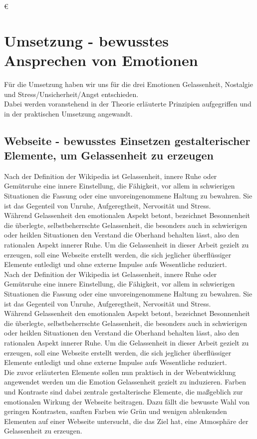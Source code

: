 €\documentclass[./dokumentation.tex]{subfiles}
\begin{document}
\chapter{Umsetzung - bewusstes Ansprechen von Emotionen}
Für die Umsetzung haben wir uns für die drei Emotionen Gelassenheit, Nostalgie und Stress/Unsicherheit/Angst entschieden.\\ 
Dabei werden voranstehend in der Theorie erläuterte Prinzipien aufgegriffen und in der praktischen Umsetzung angewandt.

\section{Webseite - bewusstes Einsetzen gestalterischer Elemente, um Gelassenheit zu erzeugen}
Nach der Definition der Wikipedia ist Gelassenheit, innere Ruhe oder Gemütsruhe eine innere Einstellung, die Fähigkeit, vor allem in schwierigen Situationen die Fassung oder eine unvoreingenommene Haltung zu bewahren. Sie ist das Gegenteil von Unruhe, Aufgeregtheit, Nervosität und Stress.\\
Während Gelassenheit den emotionalen Aspekt betont, bezeichnet Besonnenheit die überlegte, selbstbeherrschte Gelassenheit, die besonders auch in schwierigen oder heiklen Situationen den Verstand die Oberhand behalten lässt, also den rationalen Aspekt innerer Ruhe.
Um die Gelassenheit in dieser Arbeit gezielt zu erzeugen, soll eine Webseite erstellt werden, die sich jeglicher überflüssiger Elemente entledigt und ohne externe Impulse aufs Wesentliche reduziert.\\
Nach der Definition der Wikipedia ist Gelassenheit, innere Ruhe oder Gemütsruhe eine innere Einstellung, die Fähigkeit, vor allem in schwierigen Situationen die Fassung oder eine unvoreingenommene Haltung zu bewahren. Sie ist das Gegenteil von Unruhe, Aufgeregtheit, Nervosität und Stress. \\
Während Gelassenheit den emotionalen Aspekt betont, bezeichnet Besonnenheit die überlegte, selbstbeherrschte Gelassenheit, die besonders auch in schwierigen oder heiklen Situationen den Verstand die Oberhand behalten lässt, also den rationalen Aspekt innerer Ruhe.
Um die Gelassenheit in dieser Arbeit gezielt zu erzeugen, soll eine Webseite erstellt werden, die sich jeglicher überflüssiger Elemente entledigt und ohne externe Impulse aufs Wesentliche reduziert.\\
Die zuvor erläuterten Elemente sollen nun praktisch in der Webentwicklung angewendet werden um die Emotion Gelassenheit gezielt zu induzieren. Farben und Kontraste sind dabei zentrale gestalterische Elemente, die maßgeblich zur emotionalen Wirkung der Webseite beitragen. Dazu fällt die bewusste Wahl von geringen Kontrasten, sanften Farben wie Grün und wenigen ablenkenden Elementen auf einer Webseite untersucht, die das Ziel hat, eine Atmosphäre der Gelassenheit zu erzeugen. \\
\end{document}
